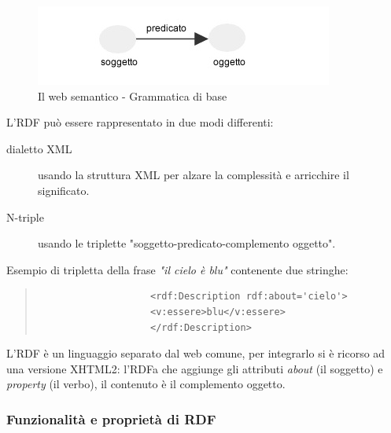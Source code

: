 				\begin{figure}
				\centering
					\includegraphics[scale=0.8]{images/LInformazioneEIlWebSemantico-RDF1}
					\caption{Il web semantico - Grammatica di base}
					\label{fig:LInformazioneEIlWebSemantico-RDF1}
				\end{figure}
				
				L'RDF può essere rappresentato in due modi differenti:
				\begin{description}
					\item[dialetto XML] usando la struttura XML per alzare la complessità e arricchire il significato.
					\item[N-triple] usando le triplette "soggetto-predicato-complemento oggetto".
				\end{description}
				Esempio di tripletta della frase \emph{"il cielo è blu"} contenente due stringhe:
				\begin{quote}
				\begin{verbatim}
					<rdf:Description rdf:about='cielo'>
					<v:essere>blu</v:essere>
					</rdf:Description>
				\end{verbatim}
				\end{quote}
				
				L'RDF è un linguaggio separato dal web comune, per integrarlo si è ricorso ad una versione XHTML2: l'RDFa che aggiunge gli attributi \emph{about} (il soggetto) e \emph{property} (il verbo), il contenuto è il complemento oggetto.
				
			
			\subsubsection{Funzionalità e proprietà di RDF}
			
